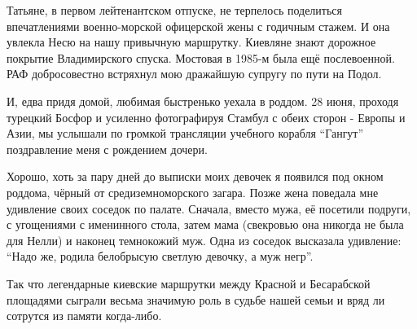 Татьяне, в первом лейтенантском отпуске, не терпелось
поделиться впечатлениями военно-морской офицерской жены с годичным стажем. И
она увлекла Несю на нашу привычную маршрутку. Киевляне знают дорожное покрытие
Владимирского спуска. Мостовая в 1985-м была ещё послевоенной. РАФ
добросовестно встряхнул мою дражайшую супругу по пути на Подол. 

И, едва придя домой, любимая быстренько уехала в роддом. 28 июня, проходя
турецкий Босфор и усиленно фотографируя Стамбул с обеих сторон - Европы и Азии,
мы услышали по громкой трансляции учебного корабля \enquote{Гангут}
поздравление меня с рождением дочери. 

Хорошо, хоть за пару дней до выписки моих девочек я появился под окном роддома,
чёрный от средиземноморского загара. Позже жена поведала мне удивление своих
соседок по палате. Сначала, вместо мужа, её посетили подруги, с угощениями с
именинного стола, затем мама (свекровью она никогда не была для Нелли) и
наконец темнокожий муж. Одна из соседок высказала удивление: \enquote{Надо же,
родила белобрысую светлую девочку, а муж негр}. 

Так что легендарные киевские маршрутки между Красной и Бесарабской площадями
сыграли весьма значимую роль в судьбе нашей семьи и вряд ли сотрутся из памяти
когда-либо.

